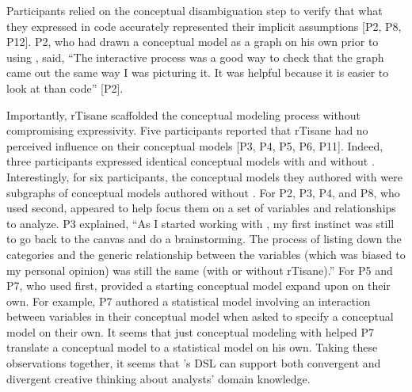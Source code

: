 Participants relied on the conceptual disambiguation step to verify that what
they expressed in code accurately represented their implicit assumptions [P2,
P8, P12]. P2, who had drawn a conceptual model as a graph on his own prior to
using \rTisane, said, ``The interactive process was a good
way to check that the graph came out the same way I was picturing it. It was
helpful because it is easier to look at than code'' [P2]. 

Importantly, rTisane scaffolded the conceptual modeling process without
compromising expressivity. Five participants reported that rTisane had no
perceived influence on their conceptual models [P3, P4, P5, P6, P11]. Indeed,
three participants expressed identical conceptual models with and without
\rTisane [P9, P11, P12]. Interestingly, for six participants, the
conceptual models they authored with \rTisane were subgraphs of conceptual models
authored without \rTisane[P2, P3, P4, P5, P7, P8]. 
For P2, P3, P4, and P8, who used \rTisane second, \rTisane appeared to help
focus them on a set of variables and relationships to analyze. P3 explained,
``As I started working with \rTisane, my first instinct was still to go back to
the canvas and do a brainstorming. The process of listing down the categories
and the generic relationship between the variables (which was biased to my
personal opinion) was still the same (with or without rTisane).'' For P5 and P7,
who used \rTisane first, \rTisane provided a starting conceptual model expand
upon on their own. For example, P7 authored a statistical model involving an
interaction between variables in their \rTisane conceptual model when asked to
specify a conceptual model on their own. It seems that just conceptual modeling
with \rTisane helped P7 translate a conceptual model to a statistical model on
his own. Taking these observations together, it seems that \rTisane's DSL can
support both convergent and divergent creative thinking about analysts' domain
knowledge. 

